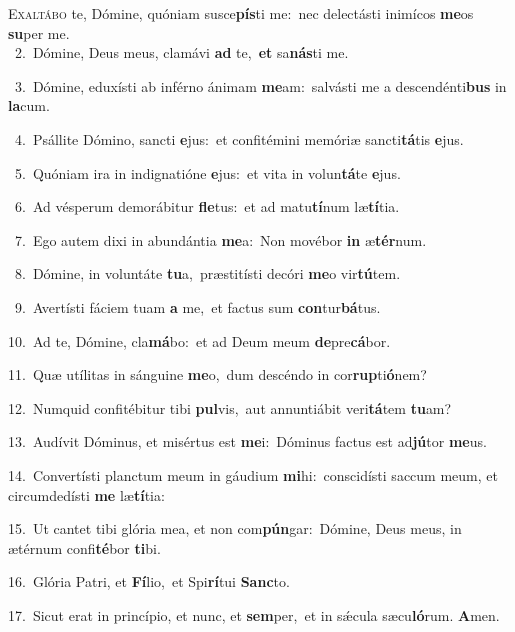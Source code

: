 \lettrine{\initial\textcolor{\initialcolor}{E}}{xaltábo} te, Dómine, quóniam susce\-\textbf{pís}\-ti me:~\star nec delectásti inimícos \textbf{me}\-os \textbf{su}\-per me.\\
{\numbfont\textcolor{\numbcolor}{~2.}}~Dómine, Deus meus, clamávi \textbf{ad} te,~\star \textbf{et} sa\-\textbf{nás}\-ti me.\par
{\numbfont\textcolor{\numbcolor}{~3.}}~Dómine, eduxísti ab inférno ánimam \textbf{me}\-am:~\star salvásti me a descendénti\textbf{bus} in \textbf{la}\-cum.\par
{\numbfont\textcolor{\numbcolor}{~4.}}~Psállite Dómino, sancti \textbf{e}\-jus:~\star et confitémini memóriæ sancti\-\textbf{tá}\-tis \textbf{e}\-jus.\par
{\numbfont\textcolor{\numbcolor}{~5.}}~Quóniam ira in indignatióne \textbf{e}\-jus:~\star et vita in volun\-\textbf{tá}\-te \textbf{e}\-jus.\par
{\numbfont\textcolor{\numbcolor}{~6.}}~Ad vésperum demorábitur \textbf{fle}\-tus:~\star et ad matu\-\textbf{tí}\-num læ\-\textbf{tí}\-tia.\par
{\numbfont\textcolor{\numbcolor}{~7.}}~Ego autem dixi in abundántia \textbf{me}\-a:~\star Non movébor \textbf{in} æ\-\textbf{tér}\-num.\par
{\numbfont\textcolor{\numbcolor}{~8.}}~Dómine, in voluntáte \textbf{tu}\-a,~\star præstitísti decóri \textbf{me}\-o vir\-\textbf{tú}\-tem.\par
{\numbfont\textcolor{\numbcolor}{~9.}}~Avertísti fáciem tuam \textbf{a} me,~\star et factus sum \textbf{con}\-tur\-\textbf{bá}\-tus.\par
{\numbfont\textcolor{\numbcolor}{10.}}~Ad te, Dómine, cla\-\textbf{má}\-bo:~\star et ad Deum meum \textbf{de}\-pre\-\textbf{cá}\-bor.\par
{\numbfont\textcolor{\numbcolor}{11.}}~Quæ utílitas in sánguine \textbf{me}\-o,~\star dum descéndo in cor\-\textbf{rup}\-ti\-\textbf{ó}\-nem?\par
{\numbfont\textcolor{\numbcolor}{12.}}~Numquid confitébitur tibi \textbf{pul}\-vis,~\star aut annuntiábit veri\-\textbf{tá}\-tem \textbf{tu}\-am?\par
{\numbfont\textcolor{\numbcolor}{13.}}~Audívit Dóminus, et misértus est \textbf{me}\-i:~\star Dóminus factus est ad\-\textbf{jú}\-tor \textbf{me}\-us.\par
{\numbfont\textcolor{\numbcolor}{14.}}~Convertísti planctum meum in gáudium \textbf{mi}\-hi:~\star conscidísti saccum meum, et circumdedísti \textbf{me} læ\-\textbf{tí}\-tia:\par
{\numbfont\textcolor{\numbcolor}{15.}}~Ut cantet tibi glória mea, et non com\-\textbf{pún}\-gar:~\star Dómine, Deus meus, in ætérnum confi\-\textbf{té}\-bor \textbf{ti}\-bi.\par
{\numbfont\textcolor{\numbcolor}{16.}}~Glória Patri, et \textbf{Fí}\-lio,~\star et Spi\-\textbf{rí}\-tui \textbf{Sanc}\-to.\par
{\numbfont\textcolor{\numbcolor}{17.}}~Sicut erat in princípio, et nunc, et \textbf{sem}\-per,~\star et in sǽcula sæcu\-\textbf{ló}\-rum. \textbf{A}\-men.\par

